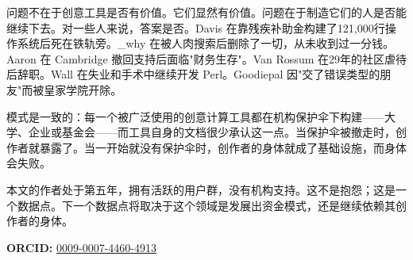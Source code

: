 \documentclass[10pt,letterpaper,twocolumn]{article}
\begin{document}
问题不在于创意工具是否有价值。它们显然有价值。问题在于制造它们的人是否能继续下去。对一些人来说，答案是否。Davis 在靠残疾补助金构建了121,000行操作系统后死在铁轨旁。\_why 在被人肉搜索后删除了一切，从未收到过一分钱。Aaron 在 Cambridge 撤回支持后面临"财务生存"。Van Rossum 在29年的社区虐待后辞职。Wall 在失业和手术中继续开发 Perl。Goodiepal 因"交了错误类型的朋友"而被皇家学院开除。

模式是一致的：每一个被广泛使用的创意计算工具都在机构保护伞下构建——大学、企业或基金会——而工具自身的文档很少承认这一点。当保护伞被撤走时，创作者就暴露了。当一开始就没有保护伞时，创作者的身体就成了基础设施，而身体会失败。

本文的作者处于第五年，拥有活跃的用户群，没有机构支持。这不是抱怨；这是一个数据点。下一个数据点将取决于这个领域是发展出资金模式，还是继续依赖其创作者的身体。

\vspace{0.5em}
\noindent\textbf{ORCID:} \href{https://orcid.org/0009-0007-4460-4913}{0009-0007-4460-4913}



\end{document}
